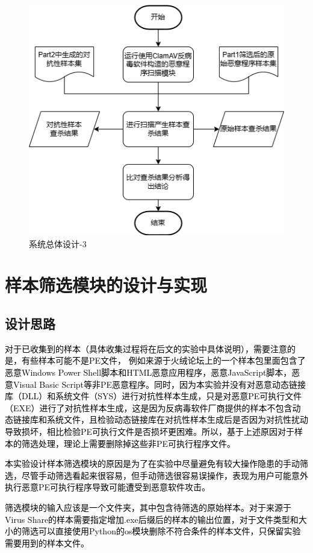 \begin{figure}
  \centering
  \includegraphics[]{images/system_design3.png}
  \caption{系统总体设计-3}\label{fig:system_design3}
\end{figure}
\section{样本筛选模块的设计与实现}

\subsection{设计思路}

\textcolor{black}{对于已收集到的样本（具体收集过程将在后文的实验中具体说明），需要注意的是，有些样本可能不是PE文件， 例如来源于火绒论坛上的一个样本包里面包含了恶意Windows Power Shell脚本和HTML恶意应用程序，恶意JavaScript脚本，恶意Visual Basic Script等非PE恶意程序。同时，因为本实验并没有对恶意动态链接库（DLL）和系统文件（SYS）进行对抗性样本生成，只是对恶意PE可执行文件（EXE）进行了对抗性样本生成，这是因为反病毒软件厂商提供的样本不包含动态链接库和系统文件，且检验动态链接库在对抗性样本生成后是否因为对抗性扰动导致损坏，相比检验PE可执行文件是否损坏更困难。所以，基于上述原因对于样本的筛选处理，理论上需要删除掉这些非PE可执行程序文件。}

\textcolor{black}{本实验设计样本筛选模块的原因是为了在实验中尽量避免有较大操作隐患的手动筛选，尽管手动筛选看起来很容易，但手动筛选很容易误操作，表现为用户可能意外执行恶意PE可执行程序导致可能遭受到恶意软件攻击。}

\textcolor{black}{筛选模块的输入应该是一个文件夹，其中包含待筛选的原始样本。对于来源于Virus Share的样本需要指定增加.exe后缀后的样本的输出位置，对于文件类型和大小的筛选可以直接使用Python的os模块删除不符合条件的样本文件，只保留实验需要用到的样本文件。 }

